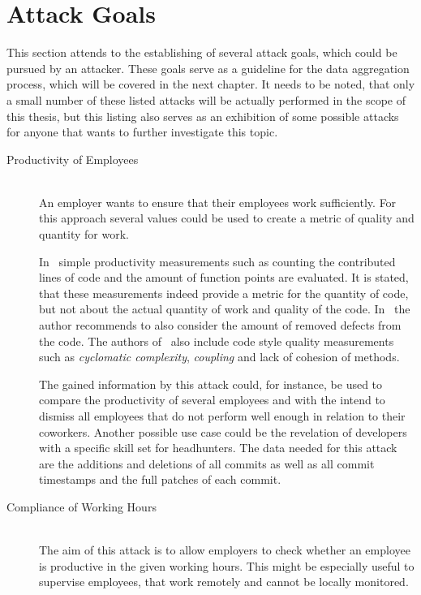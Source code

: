 \section{Attack Goals}\label{attack-goals}
This section attends to the establishing of several attack goals, which could be pursued by an attacker.
These goals serve as a guideline for the data aggregation process, which will be covered in the next chapter.
It needs to be noted, that only a small number of these listed attacks will be actually performed in the scope of this thesis, but this listing also serves as an exhibition of some possible attacks for anyone that wants to further investigate this topic.

\begin{description}
    \item[Productivity of Employees]~\label{attack:employer-monitoring} \hfill \\
        An employer wants to ensure that their employees work sufficiently.
        For this approach several values could be used to create a metric of quality and quantity for work.

        In~\cite[p.~3]{article:job-productivity} simple productivity measurements such as counting the contributed lines of code and the amount of function points are evaluated.
        It is stated, that these measurements indeed provide a metric for the quantity of code, but not about the actual quantity of work and quality of the code.
        In~\cite[p.~43]{article:measuring-programming-quality} the author recommends to also consider the amount of removed defects from the code.
        The authors of~\cite[p.~257]{article:software-productivity} also include code style quality measurements such as \emph{cyclomatic complexity}, \emph{coupling} and lack of cohesion of methods.

        The gained information by this attack could, for instance, be used to compare the productivity of several employees and with the intend to dismiss all employees that do not perform well enough in relation to their coworkers.
        Another possible use case could be the revelation of developers with a specific skill set for headhunters.
        The data needed for this attack are the additions and deletions of all commits as well as all commit timestamps and the full patches of each commit.

    \item[Compliance of Working Hours] \hfill \\
        The aim of this attack is to allow employers to check whether an employee is productive in the given working hours.
        This might be especially useful to supervise employees, that work remotely and cannot be locally monitored.


\end{description}
